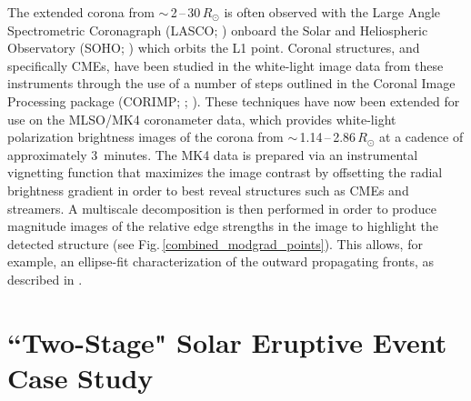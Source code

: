 \documentclass[namedreferences]{solarphysics}
\begin{document}
\begin{article}
The extended corona from $\sim$\,2\,--\,30\,$R_{\odot}$ is often observed with the Large Angle Spectrometric Coronagraph (LASCO; )  onboard the Solar and Heliospheric Observatory (SOHO; ) which orbits the L1 point. Coronal structures, and specifically CMEs, have been studied in the white-light image data from these instruments through the use of a number of steps outlined in the Coronal Image Processing package (CORIMP; ; ). These techniques have now been extended for use on the MLSO/MK4 coronameter data, which provides white-light polarization brightness images of the corona from $\sim$\,1.14\,--\,2.86\,$R_{\odot}$ at a cadence of approximately 3~minutes. The MK4 data is prepared via an instrumental vignetting function that maximizes the image contrast by offsetting the radial brightness gradient in order to best reveal structures such as CMEs and streamers. A multiscale decomposition is then performed in order to produce magnitude images of the relative edge strengths in the image to highlight the detected structure (see Fig.\,\ref{combined_modgrad_points}). This allows, for example, an ellipse-fit characterization of the outward propagating fronts, as described in .



\section{``Two-Stage" Solar Eruptive Event Case Study}
\label{sect:event}


\end{article}
\end{document}
